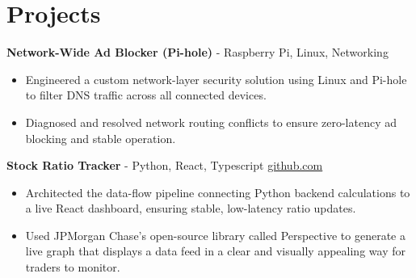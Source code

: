 \documentclass[11pt]{article}       %
\begin{document}

\vspace{-18.5pt}

\section*{Projects}

\textbf{Network-Wide Ad Blocker (Pi-hole)}{ - Raspberry Pi, Linux, Networking} \hfill \\
\vspace{-9pt}
\begin{itemize}
  \item Engineered a custom network-layer security solution using Linux and Pi-hole to filter DNS traffic across all connected devices.
  \item Diagnosed and resolved network routing conflicts to ensure zero-latency ad blocking and stable operation.
\end{itemize}

\textbf{Stock Ratio Tracker}{ - Python, React, Typescript} \hfill \href{https://github.com/Monica20030707/tradingDashboard-UI}{github.com} \\
\vspace{-9pt}
\begin{itemize}
  \item Architected the data-flow pipeline connecting Python backend calculations to a live React dashboard, ensuring stable, low-latency ratio updates. 
  \item Used JPMorgan Chase’s open-source library called Perspective to generate a live graph that displays a data feed in a clear and visually appealing way for traders to monitor.
\end{itemize}
\end{document}
